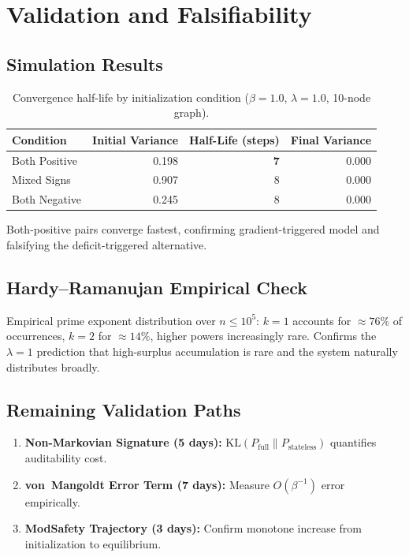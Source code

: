 \documentclass[12pt,letterpaper]{article}
\begin{document}
\section{Validation and Falsifiability}\label{sec:validation}

\subsection{Simulation Results}
\begin{table}[H]\centering
\caption{Convergence half-life by initialization condition ($\beta=1.0$, $\lambda=1.0$, 10-node graph).}
\begin{tabular}{lrrr}\toprule
\textbf{Condition}&\textbf{Initial Variance}&\textbf{Half-Life (steps)}&\textbf{Final Variance}\\\midrule
Both Positive & 0.198 & \textbf{7} & 0.000\\
Mixed Signs   & 0.907 & 8          & 0.000\\
Both Negative & 0.245 & 8          & 0.000\\
\bottomrule\end{tabular}
\end{table}

Both-positive pairs converge fastest, confirming gradient-triggered model and
falsifying the deficit-triggered alternative.

\subsection{Hardy--Ramanujan Empirical Check}
Empirical prime exponent distribution over $n\leq 10^5$:
$k=1$ accounts for $\approx 76\%$ of occurrences, $k=2$ for $\approx 14\%$,
higher powers increasingly rare. Confirms the $\lambda=1$ prediction that
high-surplus accumulation is rare and the system naturally distributes broadly.

\subsection{Remaining Validation Paths}
\begin{enumerate}
  \item \textbf{Non-Markovian Signature (5 days):}
    $\mathrm{KL}(P_{\mathrm{full}}\|P_{\mathrm{stateless}})$ quantifies auditability cost.
  \item \textbf{von~Mangoldt Error Term (7 days):}
    Measure $O(\beta^{-1})$ error empirically.
  \item \textbf{ModSafety Trajectory (3 days):}
    Confirm monotone increase from initialization to equilibrium.
\end{enumerate}
\end{document}
